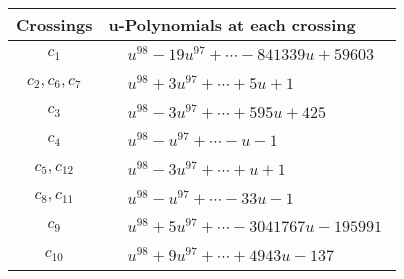 \documentclass[1p]{elsarticle_modified}
\theoremstyle{definition}
\begin{document}
\begin{tabular}{m{50pt}|m{274pt}}
Crossings & \hspace{64pt}u-Polynomials at each crossing \\
\hline $$\begin{aligned}c_{1}\end{aligned}$$&$\begin{aligned}
&u^{98}-19 u^{97}+\cdots-841339 u+59603
\end{aligned}$\\
\hline $$\begin{aligned}c_{2},c_{6},c_{7}\end{aligned}$$&$\begin{aligned}
&u^{98}+3 u^{97}+\cdots+5 u+1
\end{aligned}$\\
\hline $$\begin{aligned}c_{3}\end{aligned}$$&$\begin{aligned}
&u^{98}-3 u^{97}+\cdots+595 u+425
\end{aligned}$\\
\hline $$\begin{aligned}c_{4}\end{aligned}$$&$\begin{aligned}
&u^{98}- u^{97}+\cdots- u-1
\end{aligned}$\\
\hline $$\begin{aligned}c_{5},c_{12}\end{aligned}$$&$\begin{aligned}
&u^{98}-3 u^{97}+\cdots+u+1
\end{aligned}$\\
\hline $$\begin{aligned}c_{8},c_{11}\end{aligned}$$&$\begin{aligned}
&u^{98}- u^{97}+\cdots-33 u-1
\end{aligned}$\\
\hline $$\begin{aligned}c_{9}\end{aligned}$$&$\begin{aligned}
&u^{98}+5 u^{97}+\cdots-3041767 u-195991
\end{aligned}$\\
\hline $$\begin{aligned}c_{10}\end{aligned}$$&$\begin{aligned}
&u^{98}+9 u^{97}+\cdots+4943 u-137
\end{aligned}$\\
\hline
\end{tabular}\newpage\renewcommand{\arraystretch}{1}
\end{document}
